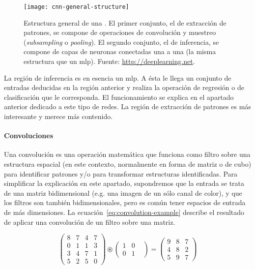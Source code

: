 \begin{figure}
	\texttt{[image: cnn-general-structure]}
	\caption[Estructura general de una ]{Estructura general de una . El primer conjunto, el de extracción de patrones, se compone de operaciones de convolución y muestreo (\textit{subsampling} o \textit{pooling}). El segundo conjunto, el de inferencia, se compone de capas de neuronas conectadas una a una (la misma estructura que un \acrshort{mlp}). Fuente: \url{http://deeplearning.net}.}
	\label{fig:cnn-general-structure}
\end{figure}

La región de inferencia es en esencia un \ac{mlp}. A ésta le llega un conjunto de entradas deducidas en la región anterior y realiza la operación de regresión o de clasificación que le corresponda. El funcionamiento se explica en el apartado anterior dedicado a este tipo de redes. La región de extracción de patrones es más interesante y merece más contenido.

\paragraph{Convoluciones}

Una convolución es una operación matemática que funciona como filtro sobre una estructura espacial (en este contexto, normalmente en forma de matriz o de cubo) para identificar patrones y/o para transformar estructuras identificadas. Para simplificar la explicación en este apartado, supondremos que la entrada se trata de una matriz bidimensional (e.g. una imagen de un sólo canal de color), y que los filtros son también bidimensionales, pero es común tener espacios de entrada de más dimensiones. La ecuación~\ref{eq:convolution-example} describe el resultado de aplicar una convolución de un filtro sobre una matriz.

\begin{equation*}
	\begin{pmatrix}
		8 & 7 & 4 & 7  \\
		0 & 1 & 1 & 3  \\
		3 & 4 & 7 & 1  \\
		5 & 2 & 5 & 0
	\end{pmatrix}
	\circledast
	\begin{pmatrix}
		1 & 0 &  \\
		0 & 1
	\end{pmatrix}
	=
	\begin{pmatrix}
		9 & 8 & 7  \\
		4 & 8 & 2  \\
		5 & 9 & 7
	\end{pmatrix}
	\label{eq:convolution-example}
\end{equation*}

